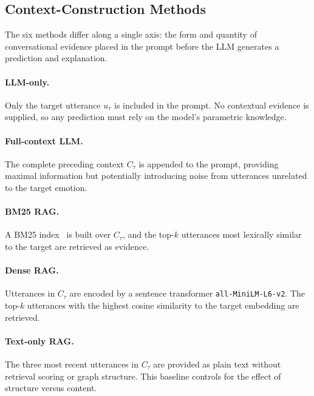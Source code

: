 \documentclass[runningheads]{llncs}
\begin{document}
\subsection{Context-Construction Methods}

The six methods differ along a single axis: the form and quantity of
conversational evidence placed in the prompt before the LLM generates a
prediction and explanation.

\paragraph{LLM-only.}
Only the target utterance $u_\tau$ is included in the prompt. No
contextual evidence is supplied, so any prediction must rely on the
model's parametric knowledge.

\paragraph{Full-context LLM.}
The complete preceding context $C_\tau$ is appended to the prompt,
providing maximal information but potentially introducing noise from
utterances unrelated to the target emotion.

\paragraph{BM25 RAG.}
A BM25 index~\cite{robertson2009bm25} is built over $C_\tau$, and the
top-$k$ utterances most lexically similar to the target are retrieved
as evidence.

\paragraph{Dense RAG.}
Utterances in $C_\tau$ are encoded by a sentence transformer
\texttt{all-MiniLM-L6-v2}. The top-$k$ utterances with the highest
cosine similarity to the target embedding are retrieved.

\paragraph{Text-only RAG.}
The three most recent utterances in $C_\tau$ are provided as plain
text without retrieval scoring or graph structure.
This baseline controls for the effect of structure versus content.
\end{document}
